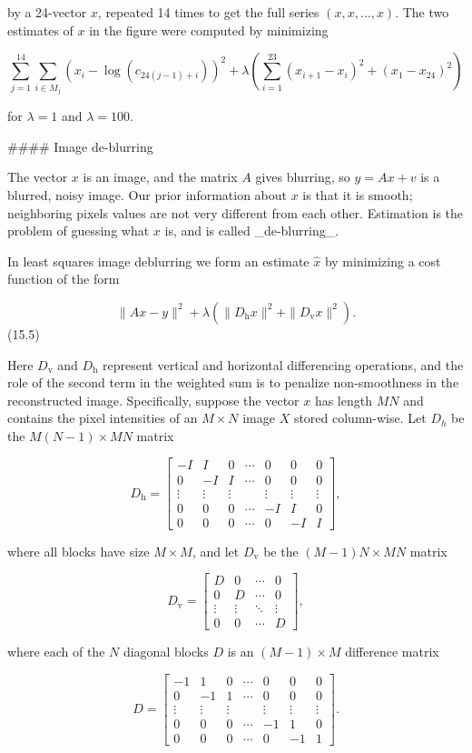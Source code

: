 by a 24-vector \(x\), repeated 14 times to get the full series \((x,x,\ldots,x)\). The two estimates of \(x\) in the figure were computed by minimizing

\[\sum_{j=1}^{14}\sum_{i\in M_{j}}\left(x_{i}-\log(c_{24(j-1)+i})\right)^{2}+ \lambda\left(\sum_{i=1}^{23}(x_{i+1}-x_{i})^{2}+(x_{1}-x_{24})^{2}\right)\]

for \(\lambda=1\) and \(\lambda=100\).

#### Image de-blurring

The vector \(x\) is an image, and the matrix \(A\) gives blurring, so \(y=Ax+v\) is a blurred, noisy image. Our prior information about \(x\) is that it is smooth; neighboring pixels values are not very different from each other. Estimation is the problem of guessing what \(x\) is, and is called _de-blurring_.

In least squares image deblurring we form an estimate \(\hat{x}\) by minimizing a cost function of the form

\[\|Ax-y\|^{2}+\lambda(\|D_{\mathrm{h}}x\|^{2}+\|D_{\mathrm{v}}x\|^{2}).\] (15.5)

Here \(D_{\mathrm{v}}\) and \(D_{\mathrm{h}}\) represent vertical and horizontal differencing operations, and the role of the second term in the weighted sum is to penalize non-smoothness in the reconstructed image. Specifically, suppose the vector \(x\) has length \(MN\) and contains the pixel intensities of an \(M\times N\) image \(X\) stored column-wise. Let \(D_{h}\) be the \(M(N-1)\times MN\) matrix

\[D_{\mathrm{h}}=\left[\begin{array}{cccccc}-I&I&0&\cdots&0&0&0\\ 0&-I&I&\cdots&0&0&0\\ \vdots&\vdots&\vdots&&\vdots&\vdots&\vdots\\ 0&0&0&\cdots&-I&I&0\\ 0&0&0&\cdots&0&-I&I\end{array}\right],\]

where all blocks have size \(M\times M\), and let \(D_{\mathrm{v}}\) be the \((M-1)N\times MN\) matrix

\[D_{\mathrm{v}}=\left[\begin{array}{ccccc}D&0&\cdots&0\\ 0&D&\cdots&0\\ \vdots&\vdots&\ddots&\vdots\\ 0&0&\cdots&D\end{array}\right],\]

where each of the \(N\) diagonal blocks \(D\) is an \((M-1)\times M\) difference matrix

\[D=\left[\begin{array}{cccccc}-1&1&0&\cdots&0&0&0\\ 0&-1&1&\cdots&0&0&0\\ \vdots&\vdots&\vdots&&\vdots&\vdots&\vdots\\ 0&0&0&\cdots&-1&1&0\\ 0&0&0&\cdots&0&-1&1\end{array}\right].\] 